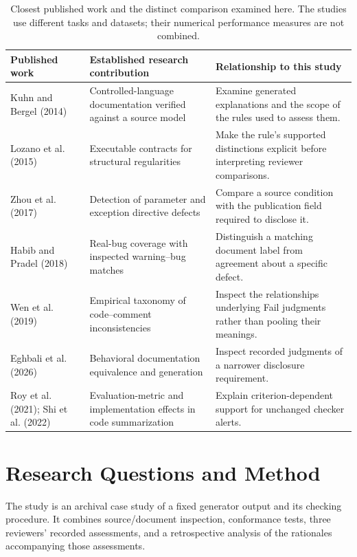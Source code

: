 \documentclass[a4paper,fleqn]{cas-dc}
\begin{document}
\begin{table}[t]
\centering
\caption{Closest published work and the distinct comparison examined here. The studies use different tasks and datasets; their numerical performance measures are not combined.}
\label{tab:related}
\begin{tabularx}{\textwidth}{@{}p{}YY@{}}
\toprule
Published work & Established research contribution & Relationship to this study \\
\midrule
Kuhn and Bergel (2014) & Controlled-language documentation verified against a source model & Examine generated explanations and the scope of the rules used to assess them. \\
Lozano et al. (2015) & Executable contracts for structural regularities & Make the rule's supported distinctions explicit before interpreting reviewer comparisons. \\
Zhou et al. (2017) & Detection of parameter and exception directive defects & Compare a source condition with the publication field required to disclose it. \\
Habib and Pradel (2018) & Real-bug coverage with inspected warning--bug matches & Distinguish a matching document label from agreement about a specific defect. \\
Wen et al. (2019) & Empirical taxonomy of code--comment inconsistencies & Inspect the relationships underlying Fail judgments rather than pooling their meanings. \\
Eghbali et al. (2026) & Behavioral documentation equivalence and generation & Inspect recorded judgments of a narrower disclosure requirement. \\
Roy et al. (2021); Shi et al. (2022) & Evaluation-metric and implementation effects in code summarization & Explain criterion-dependent support for unchanged checker alerts. \\
\bottomrule
\end{tabularx}
\end{table}

\section{Research Questions and Method}
The study is an archival case study of a fixed generator output and its checking procedure. It combines source/document inspection, conformance tests, three reviewers' recorded assessments, and a retrospective analysis of the rationales accompanying those assessments.
\end{document}
